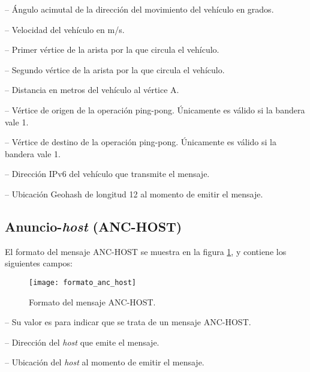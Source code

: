  -- Ángulo acimutal de la dirección del movimiento
del vehículo en grados.

 -- Velocidad del vehículo en m/s.

 -- Primer vértice de la arista por la que
circula el vehículo.

 -- Segundo vértice de la arista por la que
circula el vehículo.

 -- Distancia en metros del vehículo al vértice
A.

 -- Vértice de origen de la operación ping-pong.
Únicamente es válido si la bandera  vale 1.

 -- Vértice de destino de la operación ping-pong.
Únicamente es válido si la bandera  vale 1.

 -- Dirección IPv6 del vehículo que
transmite el mensaje.

 -- Ubicación Geohash de longitud 12 al
momento de emitir el mensaje.

\subsection{Anuncio-\textit{host} (ANC-HOST)}

\label{subsec:mensaje_anuncio_host}

El formato del mensaje ANC-HOST se muestra en la figura
\ref{fig:formato_anc_host}, y contiene los siguientes campos:

\begin{figure}[th!]
\centering
\texttt{[image: formato\_anc\_host]}
\decoRule
\caption[Formato del mensaje ANC-HOST]{Formato del mensaje ANC-HOST.}
\label{fig:formato_anc_host}
\end{figure}

 -- Su valor es  para indicar que se trata de un
mensaje ANC-HOST.

 -- Dirección del \textit{host} que emite el
mensaje.

 -- Ubicación del \textit{host} al momento
de emitir el mensaje.

